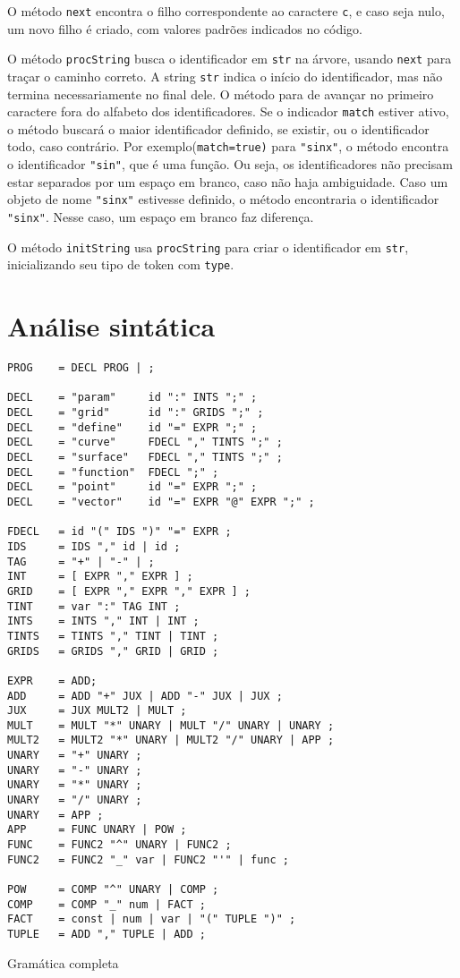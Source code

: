 \documentclass[10pt,a4paper]{article}
\newenvironment{code}{\captionsetup{type=listing}}{}
\begin{document}
O método \texttt{next} encontra o filho correspondente ao caractere \texttt{c}, e caso seja nulo,
um novo filho é criado, com valores padrões indicados no código.

O método \texttt{procString} busca o identificador em \texttt{str} na árvore,
usando \texttt{next} para traçar o caminho correto.
A string \texttt{str} indica o início do identificador, mas não termina necessariamente no final dele.
O método para de avançar no primeiro caractere fora do alfabeto dos identificadores.
Se o indicador \texttt{match} estiver ativo, o método buscará o maior identificador definido,
se existir, ou o identificador todo, caso contrário.
Por exemplo(\texttt{match=true)} para \texttt{"sinx"}, o método encontra o identificador \texttt{"sin"},
que é uma função. Ou seja, os identificadores não precisam estar separados por um espaço em branco,
caso não haja ambiguidade. Caso um objeto de nome \texttt{"sinx"} estivesse definido,
o método encontraria o identificador \texttt{"sinx"}. Nesse caso, um espaço em branco faz diferença.

O método \texttt{initString} usa \texttt{procString} para criar o identificador em \texttt{str},
inicializando seu tipo de token com \texttt{type}.


\newpage
\section{Análise sintática}

\begin{code}
\begin{verbatim}
PROG    = DECL PROG | ;

DECL    = "param"     id ":" INTS ";" ;
DECL    = "grid"      id ":" GRIDS ";" ;
DECL    = "define"    id "=" EXPR ";" ;
DECL    = "curve"     FDECL "," TINTS ";" ;
DECL    = "surface"   FDECL "," TINTS ";" ;
DECL    = "function"  FDECL ";" ;
DECL    = "point"     id "=" EXPR ";" ;
DECL    = "vector"    id "=" EXPR "@" EXPR ";" ;

FDECL   = id "(" IDS ")" "=" EXPR ;
IDS     = IDS "," id | id ;
TAG     = "+" | "-" | ;
INT     = [ EXPR "," EXPR ] ;
GRID    = [ EXPR "," EXPR "," EXPR ] ;
TINT    = var ":" TAG INT ;
INTS    = INTS "," INT | INT ;
TINTS   = TINTS "," TINT | TINT ;
GRIDS   = GRIDS "," GRID | GRID ;

EXPR    = ADD;
ADD     = ADD "+" JUX | ADD "-" JUX | JUX ;
JUX     = JUX MULT2 | MULT ;
MULT    = MULT "*" UNARY | MULT "/" UNARY | UNARY ;
MULT2   = MULT2 "*" UNARY | MULT2 "/" UNARY | APP ;
UNARY   = "+" UNARY ;
UNARY   = "-" UNARY ;
UNARY   = "*" UNARY ;
UNARY   = "/" UNARY ;
UNARY   = APP ;
APP     = FUNC UNARY | POW ;
FUNC    = FUNC2 "^" UNARY | FUNC2 ;
FUNC2   = FUNC2 "_" var | FUNC2 "'" | func ;

POW     = COMP "^" UNARY | COMP ;
COMP    = COMP "_" num | FACT ;
FACT    = const | num | var | "(" TUPLE ")" ;
TUPLE   = ADD "," TUPLE | ADD ;
\end{verbatim}
\caption{Gramática completa}
\label{grammar}
\end{code}
\end{document}
